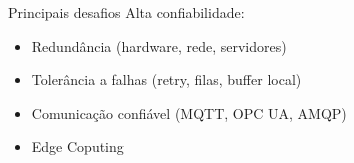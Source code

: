 \begin{frame}{Principais desafios}
    Alta confiabilidade:
    \begin{itemize}
        \item Redundância (hardware, rede, servidores)
        \item Tolerância a falhas (retry, filas, buffer local)
        \item Comunicação confiável (MQTT, OPC UA, AMQP)
        \item Edge Coputing 
    \end{itemize}
\end{frame}